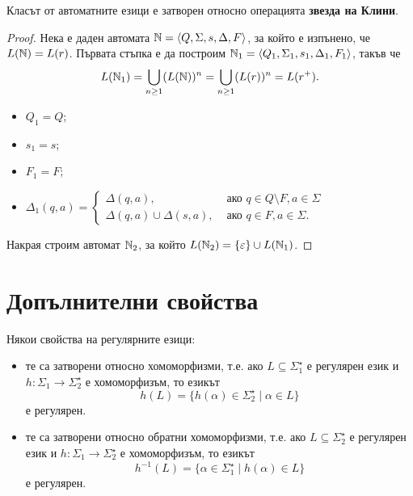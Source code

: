 \begin{lemma}
  Класът от автоматните езици е затворен относно операцията {\bf звезда на Клини}.
\end{lemma}
\begin{proof}
  Нека е даден автомата $\mathbb{N} = \langle{Q,\Sigma,s,\Delta,F}\rangle$, за който е изпънено, че
  $L(\mathbb{N}) = L(r)$.
  Първата стъпка е да построим $\mathbb{N}_1 = \langle{Q_1,\Sigma_1,s_1,\Delta_1,F_1}\rangle$, такъв че 
  \[L(\mathbb{N}_1) = \bigcup_{n\geq 1} (L(\mathbb{N}))^n = \bigcup_{n\geq 1} (L(r))^n = L(r^+).\]
  \begin{itemize}
  \item
    $Q_1 = Q$;
  \item
    $s_1 = s$;
  \item
    $F_1 = F$;
  \item
    $
    \Delta_1(q,a) = 
    \begin{cases}
      \Delta(q,a), & \text{ ако } q\in Q\setminus F, a \in \Sigma\\
      \Delta(q,a) \cup \Delta(s,a), & \text{ ако } q\in F, a\in\Sigma.
    \end{cases}
    $
  \end{itemize}
  Накрая строим автомат $\mathbb{N}_2$, за който $L(\mathbb{N}_2) = \{\varepsilon\} \cup L(\mathbb{N}_1)$.
\end{proof}


\section{Допълнителни свойства}

Някои свойства на регулярните езици:
\begin{itemize}
\item 
  те са затворени относно хомоморфизми, т.е.
  ако $L \subseteq \Sigma^\star_1$ е регулярен език и $h:\Sigma_1\to\Sigma^\star_2$ е хомоморфизъм, 
  то езикът 
  \[h(L) = \{h(\alpha) \in \Sigma^\star_2 \mid \alpha \in L\}\]
  е регулярен.
\item
  те са затворени относно обратни хомоморфизми, т.е.
  ако $L\subseteq \Sigma^\star_2$ е регулярен език и $h:\Sigma_1\to\Sigma^\star_2$ е хомоморфизъм, 
  то езикът
  \[h^{-1}(L) = \{\alpha \in \Sigma^\star_1 \mid h(\alpha) \in L\}\]
  е регулярен.
\end{itemize}

